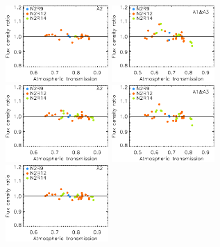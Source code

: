 \begin{figure}[ht!]
\begin{center}
  \includegraphics[clip=true, trim={0, -0.3cm, -0.3cm, 0}, width=0.35\textwidth]{Figures/Calibration/plot_flux_density_ratio_obstau_uranus_skydip_narrow_a2.pdf}
  \includegraphics[clip=true, trim={0, -0.3cm, -0.3cm, 0}, width=0.35\textwidth]{Figures/Calibration/plot_flux_density_ratio_obstau_uranus_corrected_skydip_photocorr_demo_narrow_1mm.pdf}
  \includegraphics[clip=true, trim={0, -0.3cm, -0.3cm, 0}, width=0.35\textwidth]{Figures/Calibration/plot_flux_density_ratio_obstau_uranus_corrected_skydip_photocorr_demo_narrow_a2.pdf}
  \includegraphics[clip=true, trim={0, -0.3cm, -0.3cm, 0}, width=0.35\textwidth]{Figures/Calibration/plot_flux_density_ratio_obstau_uranus_corrected_skydip_photocorr_pointing_narrow_1mm.pdf}
  \includegraphics[clip=true, trim={0, -0.3cm, -0.3cm, 0}, width=0.35\textwidth]{Figures/Calibration/plot_flux_density_ratio_obstau_uranus_corrected_skydip_photocorr_pointing_narrow_a2.pdf}

\end{center}
\end{figure}
